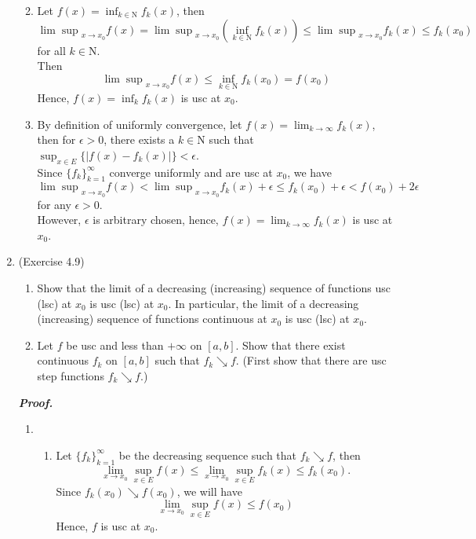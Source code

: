 \documentclass[a4paper,11pt]{article}
\begin{document}
\begin{enumerate}
\begin{enumerate}
\begin{enumerate}
\end{enumerate}

\item Let $f(x) = \inf_{k \in \mathrm{N}}f_k(x)$, then
$${\lim \sup}_{x \to x_0} f(x) 
= {\lim \sup}_{x \to x_0} (\inf_{k \in \mathrm{N}}f_k(x))
\leq {\lim \sup}_{x \to x_0}f_k(x) \leq f_k(x_0)$$
for all $k \in \mathrm{N}$.\\
Then
$${\lim \sup}_{x \to x_0} f(x)
\leq \inf_{k \in \mathrm{N}}f_k(x_0) = f(x_0)$$
Hence, $f(x) = \inf_k f_k(x)$ is usc at $x_0$.\\


\item 
By definition of uniformly convergence, let $f(x) = \lim_{k \to \infty} f_k(x)$, then for $\epsilon > 0$, there exists a $k \in \mathrm{N}$ such that $\sup_{x \in E} \{ | f(x) - f_k(x)| \} < \epsilon$.\\
Since $\{ f_k \}_{k=1}^{\infty}$ converge uniformly and are usc at $x_0$, we have
$$
{\lim \sup}_{x \to x_0} f(x) < {\lim \sup}_{x \to x_0} f_k(x) + \epsilon
\leq f_k(x_0) + \epsilon < f(x_0) + 2\epsilon$$
for any $\epsilon > 0$.\\
However, $\epsilon$ is arbitrary chosen, hence, $f(x) = \lim_{k \to \infty} f_k(x)$ is usc at $x_0$.\\
\end{enumerate}






\item (Exercise 4.9)
\begin{enumerate}

\item Show that the limit of a decreasing (increasing) sequence of functions usc (lsc) at $x_0$ is usc (lsc) at $x_0$. In particular, the limit of a decreasing (increasing) sequence of functions continuous at $x_0$ is usc (lsc) at $x_0$.

\item Let $f$ be usc and less than $+\infty$ on $[a,b]$. Show that there exist continuous $f_k$ on $[a,b]$ such that $f_k \searrow f$. (First show that there are usc step functions $f_k \searrow f$.)\\

\end{enumerate}
\textit{\textbf {Proof.}}

\begin{enumerate}

\item
\begin{enumerate}
\item
Let $\{ f_k \}_{k=1}^{\infty}$ be the decreasing sequence such that $f_k \searrow f$, then
$$\lim_{x \to x_0} \sup_{ x \in E} f(x)
\leq \lim_{x \to x_0} \sup_{ x \in E} f_k(x)
\leq f_k(x_0).$$
Since $f_k(x_0) \searrow f(x_0)$, we will have
$$\lim_{x \to x_0} \sup_{ x \in E} f(x) \leq f(x_0)$$
Hence, $f$ is usc at $x_0$.\\


\end{enumerate}
\end{enumerate}
\end{enumerate}
\end{document}
